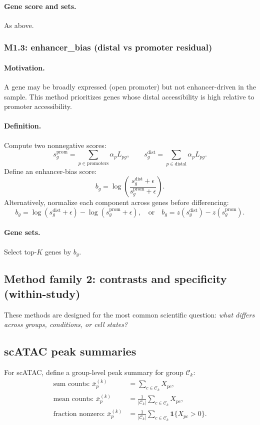 \documentclass[11pt]{article}
\begin{document}
\paragraph{Gene score and sets.} As above.

\subsubsection{M1.3: enhancer\_bias (distal vs promoter residual)}
\paragraph{Motivation.} A gene may be broadly expressed (open promoter) but not enhancer-driven in the sample. This method prioritizes genes whose distal accessibility is high relative to promoter accessibility.
\paragraph{Definition.} Compute two nonnegative scores:
\[
s_g^{\mathrm{prom}} = \sum_{p \in \mathrm{promoters}} \alpha_p L_{pg}, \qquad
s_g^{\mathrm{dist}} = \sum_{p \in \mathrm{distal}} \alpha_p L_{pg}.
\]
Define an enhancer-bias score:
\begin{equation}
b_g = \log\left(\frac{s_g^{\mathrm{dist}}+\epsilon}{s_g^{\mathrm{prom}}+\epsilon}\right).
\label{eq:enhancer_bias}
\end{equation}
Alternatively, normalize each component across genes before differencing:
\[
b_g = \log(s_g^{\mathrm{dist}}+\epsilon) - \log(s_g^{\mathrm{prom}}+\epsilon),
\quad \text{or} \quad
b_g = z(s_g^{\mathrm{dist}}) - z(s_g^{\mathrm{prom}}).
\]
\paragraph{Gene sets.} Select top-$K$ genes by $b_g$.

\subsection{Method family 2: contrasts and specificity (within-study)}
\label{sec:contrast_family}
These methods are designed for the most common scientific question: \emph{what differs across groups, conditions, or cell states?}

\subsection{scATAC peak summaries}
\label{sec:sc_peak_summaries}
For scATAC, define a group-level peak summary for group $\mathcal{C}_k$:
\begin{align*}
\text{sum counts: } \bar{x}_{p}^{(k)} &= \sum_{c\in\mathcal{C}_k} X_{pc}, \\
\text{mean counts: } \bar{x}_{p}^{(k)} &= \frac{1}{|\mathcal{C}_k|}\sum_{c\in\mathcal{C}_k} X_{pc}, \\
\text{fraction nonzero: } \bar{x}_{p}^{(k)} &= \frac{1}{|\mathcal{C}_k|}\sum_{c\in\mathcal{C}_k} \mathbf{1}\{X_{pc}>0\}.
\end{align*}
\end{document}
